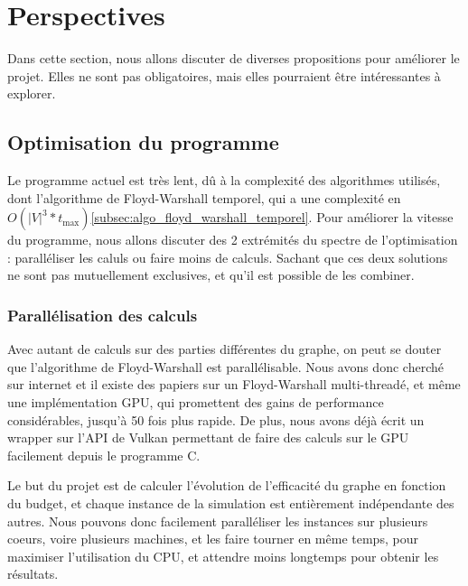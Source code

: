 \section{Perspectives}\label{sec:perspectives}
Dans cette section, nous allons discuter de diverses propositions pour améliorer le projet.
Elles ne sont pas obligatoires, mais elles pourraient être intéressantes à explorer.

\subsection{Optimisation du programme}\label{subsec:optimisation_du_programme}

Le programme actuel est très lent, dû à la complexité des algorithmes utilisés, dont l'algorithme de Floyd-Warshall temporel, qui a une complexité en $O(|V|^3*t_{\max})$\ref{subsec:algo_floyd_warshall_temporel}.
Pour améliorer la vitesse du programme, nous allons discuter des 2 extrémités du spectre de l'optimisation : paralléliser les caluls ou faire moins de calculs.
Sachant que ces deux solutions ne sont pas mutuellement exclusives, et qu'il est possible de les combiner.

\subsubsection{Parallélisation des calculs}\label{subsubsec:parallelisation}

\label{subsubsubsec:parallelisation_algorithme}
Avec autant de calculs sur des parties différentes du graphe, on peut se douter que l'algorithme de Floyd-Warshall est parallélisable.
Nous avons donc cherché sur internet et il existe des papiers sur un Floyd-Warshall multi-threadé\cite{Multithread_FW}\cite{pradhan2013finding}, et même une implémentation GPU\cite{GPU_FW}, qui promettent des gains de performance considérables, jusqu'à 50 fois plus rapide.
De plus, nous avons déjà écrit un wrapper sur l'API de Vulkan permettant de faire des calculs sur le GPU facilement depuis le programme C.

\label{subsubsubsec:parallelisation_simulations} 
Le but du projet est de calculer l'évolution de l'efficacité du graphe en fonction du budget, et chaque instance de la simulation est entièrement indépendante des autres.
Nous pouvons donc facilement paralléliser les instances sur plusieurs coeurs, voire plusieurs machines, et les faire tourner en même temps, pour maximiser l'utilisation du CPU, et attendre moins longtemps pour obtenir les résultats.

